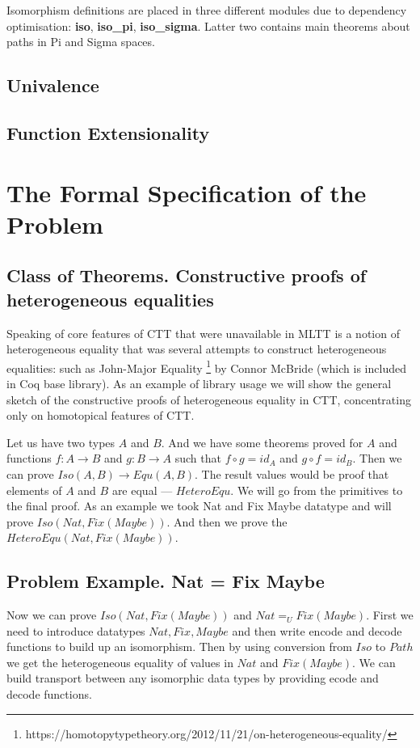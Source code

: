\documentclass{article}
\begin{document}
Isomorphism definitions are placed in three different modules due to dependency
optimisation: {\bf iso}, {\bf iso\_pi}, {\bf iso\_sigma}. Latter two contains
main theorems about paths in Pi and Sigma spaces.

\subsection{Univalence}

\subsection{Function Extensionality}

\section{The Formal Specification of the Problem}

\subsection{Class of Theorems. Constructive proofs of heterogeneous equalities}

Speaking of core features of CTT that were unavailable in MLTT is a notion
of heterogeneous equality that was several attempts to construct heterogeneous equalities:
such as John-Major Equality \footnote{https://homotopytypetheory.org/2012/11/21/on-heterogeneous-equality/}
by Connor McBride (which is included in Coq base library). As an example of library usage
we will show the general sketch of the constructive proofs of heterogeneous equality in CTT,
concentrating only on homotopical features of CTT.

Let us have two types $A$ and $B$. And we have some theorems proved for $A$ and functions
$f: A \rightarrow B$ and $g: B \rightarrow A$ such that $f \circ g = id_A$ and $g \circ f = id_B$. Then we
can prove $Iso(A,B) \rightarrow Equ(A,B)$. The result values would be proof that
elements of $A$ and $B$ are equal --- $HeteroEqu$. We will go from the primitives to the final proof.
As an example we took Nat and Fix Maybe datatype and will prove $Iso(Nat,Fix(Maybe))$.
And then we prove the $HeteroEqu(Nat,Fix(Maybe))$.

\subsection{Problem Example. Nat = Fix Maybe}

Now we can prove $Iso(Nat, Fix(Maybe))$ and $Nat =_U Fix(Maybe)$.
First we need to introduce datatypes $Nat, Fix, Maybe$ and then write encode and decode
functions to build up an isomorphism. Then by using conversion
from $Iso$ to $Path$ we get the heterogeneous equality of values in $Nat$ and $Fix(Maybe)$.
We can build transport between any isomorphic data types by providing ecode and decode functions.
\end{document}
